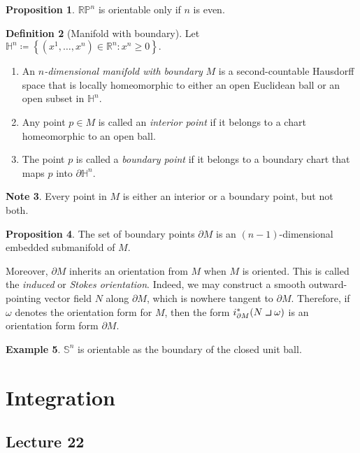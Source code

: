 \documentclass[10pt,letterpaper,cm]{nupset}
\theoremstyle{definition}
\newtheorem{definition}{Definition}[subsection]
\newtheorem{exmp}[definition]{Example}
\newtheorem{note}[definition]{Note}
\theoremstyle{theorem}
\newtheorem{prop}[definition]{Proposition}
\theoremstyle{remark}
\renewcommand{\H}{\mathbb H}
\newcommand{\R}{\mathbb R}
\newcommand{\RP}{\mathbb{RP}}
\renewcommand{\S}{\mathbb S}
\newcommand{\1}{\mathbf{1}}
\newcommand{\0}{\vec 0}
\newcommand{\intprodl}{%
    \mathbin{\scalebox{1.5}{$\lrcorner$}}%
}
\begin{document}
\begin{prop}
$\RP^n$ is orientable only if $n$ is even. 
\end{prop}

\begin{definition}[Manifold with boundary]
Let $\H^n\coloneqq  \left\{(x^1, \ldots, x^n) \in \R^n : x^n \geq 0\right\}.$ 
\begin{enumerate}
\item An \textit{$n$-dimensional manifold with boundary} $M$ is a second-countable Hausdorff space that is locally homeomorphic to either an open Euclidean ball or an open subset in $\H^n$. 
\item Any point $p\in M$ is called an \textit{interior point} if it belongs to a chart homeomorphic to an open ball. 
\item The  point $p$ is called a \textit{boundary point} if it belongs to a boundary chart that maps $p$ into $\partial{\H^n}$.
\end{enumerate}
\end{definition}

\begin{note}
Every point in $M$ is either an interior or a boundary point, but not both.
\end{note}

\begin{prop}
The set of boundary points $\partial{M}$ is an $(n-1)$-dimensional embedded submanifold of $M$.
\end{prop}


Moreover, $\partial{M}$ inherits an orientation from $M$ when $M$ is oriented. This is called the \textit{induced} or \textit{Stokes orientation}. Indeed, we may construct a smooth  outward-pointing vector field $N$ along $\partial{M}$, which is nowhere tangent to $\partial{M}$. Therefore,  if $\omega$ denotes the orientation form for $M$, then the form $i^{\ast}_{\partial{M}}(N \intprodl \omega)$ is an orientation form form $\partial{M}$.


\begin{exmp}
$\S^n$ is orientable as the boundary of the closed unit ball.
\end{exmp}

\section{Integration}

\subsection{Lecture 22}
\end{document}
